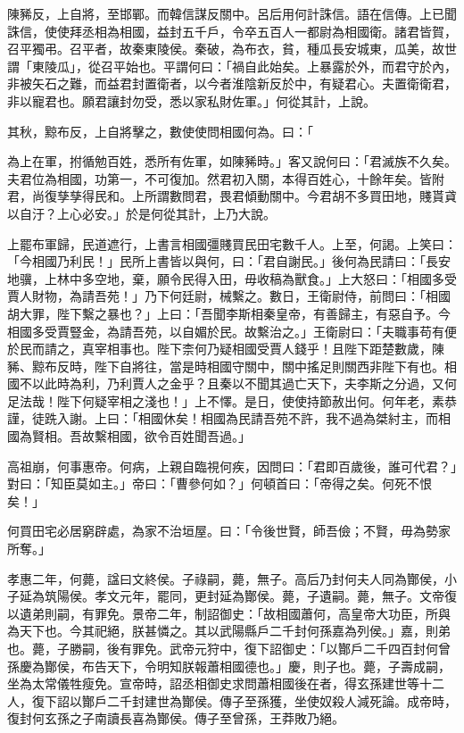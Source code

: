\begin{pinyinscope}
陳豨反，上自將，至邯鄲。而韓信謀反關中。呂后用何計誅信。語在信傳。上已聞誅信，使使拜丞相為相國，益封五千戶，令卒五百人一都尉為相國衛。諸君皆賀，召平獨弔。召平者，故秦東陵侯。秦破，為布衣，貧，種瓜長安城東，瓜美，故世謂「東陵瓜」，從召平始也。平謂何曰：「禍自此始矣。上暴露於外，而君守於內，非被矢石之難，而益君封置衛者，以今者淮陰新反於中，有疑君心。夫置衛衛君，非以寵君也。願君讓封勿受，悉以家私財佐軍。」何從其計，上說。

其秋，黥布反，上自將擊之，數使使問相國何為。曰：「

為上在軍，拊循勉百姓，悉所有佐軍，如陳豨時。」客又說何曰：「君滅族不久矣。夫君位為相國，功第一，不可復加。然君初入關，本得百姓心，十餘年矣。皆附君，尚復孳孳得民和。上所謂數問君，畏君傾動關中。今君胡不多買田地，賤貰貣以自汙？上心必安。」於是何從其計，上乃大說。

上罷布軍歸，民道遮行，上書言相國彊賤買民田宅數千人。上至，何謁。上笑曰：「今相國乃利民！」民所上書皆以與何，曰：「君自謝民。」後何為民請曰：「長安地骥，上林中多空地，棄，願令民得入田，毋收稿為獸食。」上大怒曰：「相國多受賈人財物，為請吾苑！」乃下何廷尉，械繫之。數日，王衛尉侍，前問曰：「相國胡大罪，陛下繫之暴也？」上曰：「吾聞李斯相秦皇帝，有善歸主，有惡自予。今相國多受賈豎金，為請吾苑，以自媚於民。故繫治之。」王衛尉曰：「夫職事苟有便於民而請之，真宰相事也。陛下柰何乃疑相國受賈人錢乎！且陛下距楚數歲，陳豨、黥布反時，陛下自將往，當是時相國守關中，關中搖足則關西非陛下有也。相國不以此時為利，乃利賈人之金乎？且秦以不聞其過亡天下，夫李斯之分過，又何足法哉！陛下何疑宰相之淺也！」上不懌。是日，使使持節赦出何。何年老，素恭謹，徒跣入謝。上曰：「相國休矣！相國為民請吾苑不許，我不過為桀紂主，而相國為賢相。吾故繫相國，欲令百姓聞吾過。」

高祖崩，何事惠帝。何病，上親自臨視何疾，因問曰：「君即百歲後，誰可代君？」對曰：「知臣莫如主。」帝曰：「曹參何如？」何頓首曰：「帝得之矣。何死不恨矣！」

何買田宅必居窮辟處，為家不治垣屋。曰：「令後世賢，師吾儉；不賢，毋為勢家所奪。」

孝惠二年，何薨，諡曰文終侯。子祿嗣，薨，無子。高后乃封何夫人同為酇侯，小子延為筑陽侯。孝文元年，罷同，更封延為酇侯。薨，子遺嗣。薨，無子。文帝復以遺弟則嗣，有罪免。景帝二年，制詔御史：「故相國蕭何，高皇帝大功臣，所與為天下也。今其祀絕，朕甚憐之。其以武陽縣戶二千封何孫嘉為列侯。」嘉，則弟也。薨，子勝嗣，後有罪免。武帝元狩中，復下詔御史：「以酇戶二千四百封何曾孫慶為酇侯，布告天下，令明知朕報蕭相國德也。」慶，則子也。薨，子壽成嗣，坐為太常儀牲瘦免。宣帝時，詔丞相御史求問蕭相國後在者，得玄孫建世等十二人，復下詔以酇戶二千封建世為酇侯。傳子至孫獲，坐使奴殺人減死論。成帝時，復封何玄孫之子南讀長喜為酇侯。傳子至曾孫，王莽敗乃絕。


\end{pinyinscope}
